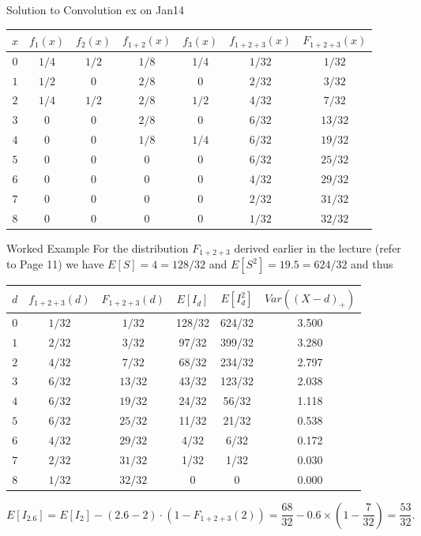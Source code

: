\documentclass[11pt]{beamer}
\begin{document}
\begin{frame}{Solution to Convolution ex on Jan14}


\begin{tabular}{ccccccc}
      \hline $x$ & $f_{1}\left( x\right) $ & $f_{2}\left( x\right) $ &
      $f_{1+2}\left(
        x\right) $ & $f_{3}\left( x\right) $ & $f_{1+2+3}\left( x\right) $ & $%
      F_{1+2+3}\left( x\right) $ \\ \hline
      $0$ & $1/4$ & $1/2$ & $1/8$ & $1/4$ & $1/32$ & $1/32$ \\
      $1$ & $1/2$ & $0$ & $2/8$ & $0$ & $2/32$ & $3/32$ \\
      $2$ & $1/4$ & $1/2$ & $2/8$ & $1/2$ & $4/32$ & $7/32$ \\
      $3$ & $0$ & $0$ & $2/8$ & $0$ & $6/32$ & $13/32$ \\
      $4$ & $0$ & $0$ & $1/8$ & $1/4$ & $6/32$ & $19/32$ \\
      $5$ & $0$ & $0$ & $0$ & $0$ & $6/32$ & $25/32$ \\
      $6$ & $0$ & $0$ & $0$ & $0$ & $4/32$ & $29/32$ \\
      $7$ & $0$ & $0$ & $0$ & $0$ & $2/32$ & $31/32$ \\
      $8$ & $0$ & $0$ & $0$ & $0$ & $1/32$ & $32/32$ \\ \hline
    \end{tabular}

\end{frame}
\begin{frame}{Worked Example}
  For the distribution $F_{1+2+3}$ derived earlier in the lecture (refer to Page 11)
  we have $E[S]=4=128/32$ and $E[S^2]=19.5=624/32$ and thus
  \begin{center}
    \small
    \begin{tabular}{c|ccccc}
      $d$ & $f_{1+2+3}(d)$ & $F_{1+2+3}(d)$ & $E[I_d]$ & $E[I_d^2]$ & $Var((X-d)_+)$ \\ \hline
      $0$ & $1/32$ & $1/32$   & 128/32 & 624/32 & 3.500 \\
      $1$ & $2/32$ & $3/32$   & 97/32   & 399/32 & 3.280 \\
      $2$ & $4/32$ & $7/32$   & 68/32   & 234/32 & 2.797 \\
      $3$ & $6/32$ & $13/32$ & 43/32   & 123/32 & 2.038 \\
      $4$ & $6/32$ & $19/32$ & 24/32   & 56/32    & 1.118 \\
      $5$ & $6/32$ & $25/32$ & 11/32   & 21/32    & 0.538 \\
      $6$ & $4/32$ & $29/32$ & 4/32     & 6/32      & 0.172 \\
      $7$ & $2/32$ & $31/32$ & 1/32     & 1/32      & 0.030 \\
      $8$& $1/32$  & $32/32$ & 0           & 0           & 0.000 \\
    \end{tabular}
  \end{center}
  $$E[I_{2.6}]=E[I_2]-(2.6-2)\cdot(1-F_{1+2+3}(2))=\frac{68}{32}-0.6\times (1-\frac{7}{32})=\frac{53}{32}.$$
\end{frame}
\end{document}
